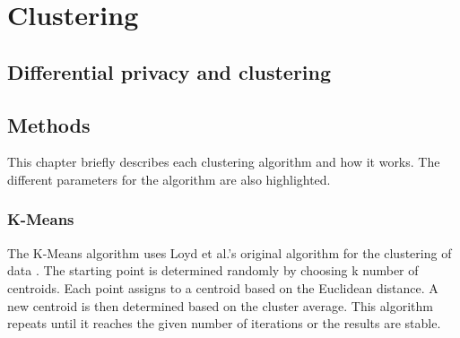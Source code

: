 \section{Clustering}

\subsection{Differential privacy and clustering}
\subsection{Methods}
This chapter briefly describes each clustering algorithm and how it works. The different parameters for the algorithm are also highlighted.
\subsubsection{K-Means} \label{theory:kmeans}
The K-Means algorithm uses Loyd et al.'s original algorithm for the clustering of data \citep{1056489}.
The starting point is determined randomly by choosing k number of centroids.
Each point assigns to a centroid based on the Euclidean distance.
A new centroid is then determined based on the cluster average.
This algorithm repeats until it reaches the given number of iterations or the results are stable.


